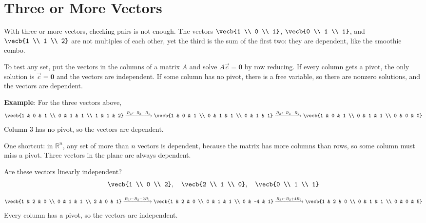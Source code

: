 \section{Three or More Vectors}

With three or more vectors, checking pairs is not enough. The vectors
$\vecb{1 \\ 0 \\ 1}$, $\vecb{0 \\ 1 \\ 1}$, and $\vecb{1 \\ 1 \\ 2}$ are
not multiples of each other, yet the third is the sum of the first two:
they are dependent, like the smoothie combo.

To test any set, put the vectors in the columns of a matrix $A$ and solve
$A\vec{c} = \mathbf{0}$ by row reducing. If every column gets a pivot,
the only solution is $\vec{c} = \mathbf{0}$ and the vectors are
independent. If some column has no pivot, there is a free variable, so
there are nonzero solutions, and the vectors are dependent.

\textbf{Example}: For the three vectors above,
$$\vecb{1 & 0 & 1 \\ 0 & 1 & 1 \\ 1 & 1 & 2} \xrightarrow{R_3 \leftarrow R_3 - R_1}
\vecb{1 & 0 & 1 \\ 0 & 1 & 1 \\ 0 & 1 & 1} \xrightarrow{R_3 \leftarrow R_3 - R_2}
\vecb{1 & 0 & 1 \\ 0 & 1 & 1 \\ 0 & 0 & 0}$$
Column 3 has no pivot, so the vectors are dependent.

One shortcut: in $\mathbb{R}^n$, any set of more than $n$ vectors is
dependent, because the matrix has more columns than rows, so some column
must miss a pivot. Three vectors in the plane are always dependent.

\begin{Exercise}[title = {Independent or Not?}, label = indep_rref]
Are these vectors linearly independent?
$$\vecb{1 \\ 0 \\ 2},\quad \vecb{2 \\ 1 \\ 0},\quad \vecb{0 \\ 1 \\ 1}$$
\end{Exercise}
\begin{Answer}[ref = indep_rref]
$$\vecb{1 & 2 & 0 \\ 0 & 1 & 1 \\ 2 & 0 & 1} \xrightarrow{R_3 \leftarrow R_3 - 2R_1}
\vecb{1 & 2 & 0 \\ 0 & 1 & 1 \\ 0 & -4 & 1} \xrightarrow{R_3 \leftarrow R_3 + 4R_2}
\vecb{1 & 2 & 0 \\ 0 & 1 & 1 \\ 0 & 0 & 5}$$
Every column has a pivot, so the vectors are independent.
\end{Answer}

